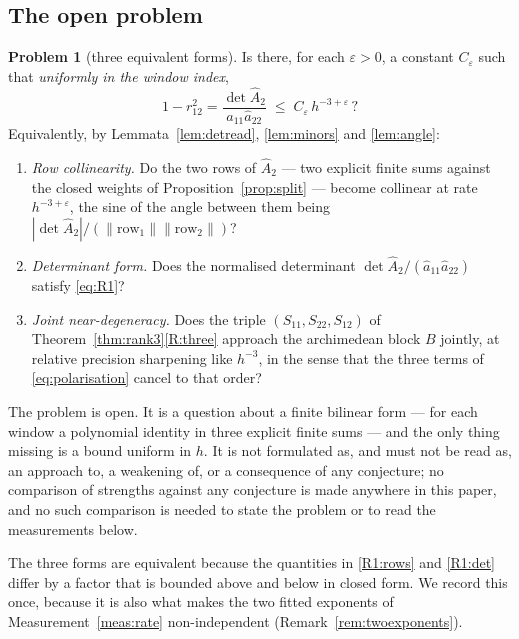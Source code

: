 \documentclass[11pt,a4paper]{article}
\theoremstyle{plain}
\theoremstyle{definition}
\newtheorem{problem}[theorem]{Problem}
\newcommand{\Ah}{\widehat{A}}
\newcommand{\ah}{\widehat{a}}
\begin{document}
\subsection{The open problem}
\label{sec:problem71}

\begin{problem}[three equivalent forms]
\label{prob:R1}
Is there, for each $\varepsilon>0$, a constant $C_\varepsilon$ such that
\emph{uniformly in the window index},
\begin{equation}
\label{eq:R1}
  1-r_{12}^{2}
  =\frac{\det\Ah_2}{\ah_{11}\ah_{22}}
  \;\le\;C_\varepsilon\,h^{-3+\varepsilon}\,?
\end{equation}
Equivalently, by Lemmata~\ref{lem:detread}, \ref{lem:minors} and
\ref{lem:angle}:
\begin{enumerate}[label=\textup{(\alph*)},leftmargin=2.6em]
\item\label{R1:rows} \emph{Row collinearity.} Do the two rows of $\Ah_2$ ---
  two explicit finite sums against the closed weights of
  Proposition~\ref{prop:split} --- become collinear at rate $h^{-3+\varepsilon}$,
  the sine of the angle between them being
  $|\det\Ah_2|/(\lVert\text{row}_1\rVert\lVert\text{row}_2\rVert)$?
\item\label{R1:det} \emph{Determinant form.} Does the normalised determinant
  $\det\Ah_2/(\ah_{11}\ah_{22})$ satisfy \eqref{eq:R1}?
\item\label{R1:triple} \emph{Joint near-degeneracy.} Does the triple
  $(S_{11},S_{22},S_{12})$ of Theorem~\ref{thm:rank3}\ref{R:three} approach the
  archimedean block $B$ jointly, at relative precision sharpening like
  $h^{-3}$, in the sense that the three terms of \eqref{eq:polarisation} cancel
  to that order?
\end{enumerate}
The problem is open. It is a question about a finite bilinear form --- for each
window a polynomial identity in three explicit finite sums --- and the only
thing missing is a bound uniform in $h$. It is not formulated as, and must not
be read as, an approach to, a weakening of, or a consequence of any conjecture;
no comparison of strengths against any conjecture is made anywhere in this
paper, and no such comparison is needed to state the problem or to read the
measurements below.
\end{problem}

The three forms are equivalent because the quantities in \ref{R1:rows} and
\ref{R1:det} differ by a factor that is bounded above and below in closed form.
We record this once, because it is also what makes the two fitted exponents of
Measurement~\ref{meas:rate} non-independent (Remark~\ref{rem:twoexponents}).
\end{document}
